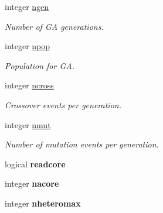 \begin{DoxyCompactItemize}
\mbox{\label{namespaceglobaldata_a278f8c4c5e8b78bcb49f200998b05951}} 
integer \mbox{\hyperlink{namespaceglobaldata_a278f8c4c5e8b78bcb49f200998b05951}{ngen}}
\begin{DoxyCompactList}\small\item\em Number of GA generations. \end{DoxyCompactList}\item 
\mbox{\label{namespaceglobaldata_a4ec4db4c7c46c1f7312d1895d739baf0}} 
integer \mbox{\hyperlink{namespaceglobaldata_a4ec4db4c7c46c1f7312d1895d739baf0}{npop}}
\begin{DoxyCompactList}\small\item\em Population for GA. \end{DoxyCompactList}\item 
\mbox{\label{namespaceglobaldata_ab9c8b3880f658f3691b4ed143252321d}} 
integer \mbox{\hyperlink{namespaceglobaldata_ab9c8b3880f658f3691b4ed143252321d}{ncross}}
\begin{DoxyCompactList}\small\item\em Crossover events per generation. \end{DoxyCompactList}\item 
\mbox{\label{namespaceglobaldata_ad99b31a58e97248e5f51d1e2c5b99645}} 
integer \mbox{\hyperlink{namespaceglobaldata_ad99b31a58e97248e5f51d1e2c5b99645}{nmut}}
\begin{DoxyCompactList}\small\item\em Number of mutation events per generation. \end{DoxyCompactList}\item 
\mbox{\label{namespaceglobaldata_a632c6307699ad0ba1249c809d6380947}} 
logical {\bfseries readcore}
\item 
\mbox{\label{namespaceglobaldata_a384c0134255cf385fa3b9ace7210c6e1}} 
integer {\bfseries nacore}
\item 
\mbox{\label{namespaceglobaldata_a5872444d02b2f8059e55c9714a198ac9}} 
integer {\bfseries nheteromax}
\item 
\mbox{\label{namespaceglobaldata_a39c8b89979d9704364fd0a7f971af2d9}} 

\end{DoxyCompactItemize}
